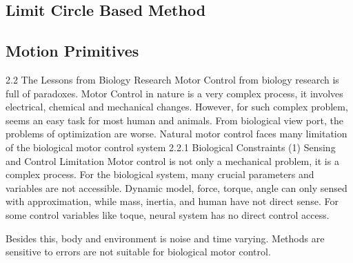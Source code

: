 \subsection{Limit Circle Based Method}
\subsection{Motion Primitives}
2.2 The Lessons from Biology Research
Motor Control from biology research is full of paradoxes.
Motor Control in nature is a very complex process, it involves electrical, chemical and mechanical changes. However, for such complex problem, seems an easy task for most human and animals.
From biological view port, the problems of optimization are worse. Natural motor control faces many limitation of the biological motor control system
2.2.1 Biological Constraints
(1) Sensing and Control Limitation
Motor control is not only a mechanical problem, it is a complex process. For the biological system,  many crucial parameters and variables are not accessible. Dynamic model, force, torque, angle can only sensed with approximation, while mass, inertia, and human have not direct sense. For some control variables like toque, neural system has no direct control access.

Besides this, body and environment is noise and time varying.
Methods are sensitive to errors are not suitable for biological motor control.

